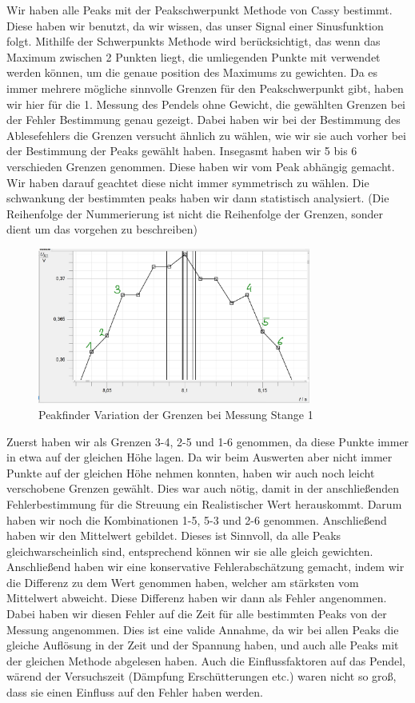 \documentclass[twoside]{protokoll}
\begin{document}
 
Wir haben alle Peaks mit der Peakschwerpunkt Methode von Cassy bestimmt.
Diese haben wir benutzt, da wir wissen, das unser Signal einer Sinusfunktion folgt.
Mithilfe der Schwerpunkts Methode wird berücksichtigt, das wenn das Maximum zwischen 2 Punkten liegt, die umliegenden Punkte mit verwendet werden können, um die genaue position des Maximums zu gewichten.
Da es immer mehrere mögliche sinnvolle Grenzen für den Peakschwerpunkt gibt, haben wir hier für die 1. Messung des Pendels ohne Gewicht, die gewählten Grenzen bei der Fehler Bestimmung genau gezeigt.
Dabei haben wir bei der Bestimmung des Ablesefehlers die Grenzen versucht ähnlich zu wählen, wie wir sie auch vorher bei der Bestimmung der Peaks gewählt haben.
Insegasmt haben wir 5 bis 6 verschieden Grenzen genommen. Diese haben wir vom Peak abhängig gemacht. Wir haben darauf geachtet diese nicht immer symmetrisch zu wählen.
Die schwankung der bestimmten peaks haben wir dann statistisch analysiert. 
(Die Reihenfolge der Nummerierung ist nicht die Reihenfolge der Grenzen, sonder dient um das vorgehen zu beschreiben)
\begin{figure}[H]
    \centering
    \includegraphics[width=0.8\textwidth]{plots/unsicherheit-bestimmen-stange1-punkte.pdf}
    \caption{Peakfinder Variation der Grenzen bei Messung Stange 1}     
\end{figure}
Zuerst haben wir als Grenzen 3-4, 2-5 und 1-6 genommen, da diese Punkte immer in etwa auf der gleichen Höhe lagen.
Da wir beim Auswerten aber nicht immer Punkte auf der gleichen Höhe nehmen konnten, haben wir auch noch leicht verschobene Grenzen gewählt.
Dies war auch nötig, damit in der anschließenden Fehlerbestimmung für die Streuung ein Realistischer Wert herauskommt.
Darum haben wir noch die Kombinationen 1-5, 5-3 und 2-6 genommen.
Anschließend haben wir den Mittelwert gebildet.
Dieses ist Sinnvoll, da alle Peaks gleichwarscheinlich sind, entsprechend können wir sie alle gleich gewichten.
Anschließend haben wir eine konservative Fehlerabschätzung gemacht, indem wir die Differenz zu dem Wert genommen haben, welcher am stärksten vom Mittelwert abweicht.
Diese Differenz haben wir dann als Fehler angenommen.
Dabei haben wir diesen Fehler auf die Zeit für alle bestimmten Peaks von der Messung angenommen.
Dies ist eine valide Annahme, da wir bei allen Peaks die gleiche Auflösung in der Zeit und der Spannung haben, und auch alle Peaks mit der gleichen Methode abgelesen haben.
Auch die Einflussfaktoren auf das Pendel, wärend der Versuchszeit (Dämpfung Erschütterungen etc.) waren nicht so groß, dass sie einen Einfluss auf den Fehler haben werden.
\end{document}
